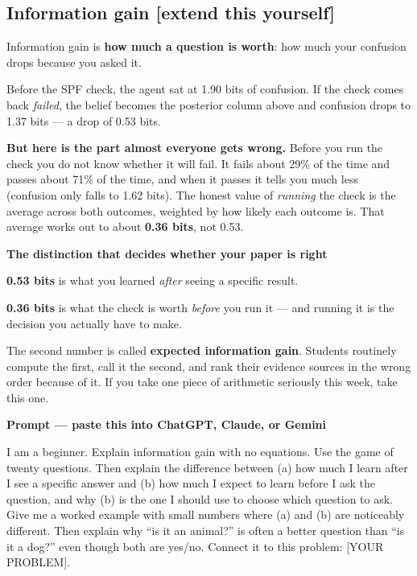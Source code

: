 \documentclass[11pt,a4paper]{article}
\newcommand{\keyword}[1]{\textbf{#1}}
\newcommand{\boxtitle}[1]{{\bfseries #1}\par\vspace{2pt}}
\newcommand{\taught}{\hfill{\footnotesize\sffamily\color{sbaccent}[extend this yourself]}}
\newenvironment{learnprompt}
  {\begin{sbbox}\boxtitle{Prompt --- paste this into ChatGPT, Claude, or Gemini}%
   \ttfamily\small\raggedright}
  {\end{sbbox}}
\begin{document}
\subsection{Information gain \taught}

Information gain is \textbf{how much a question is worth}: how much your confusion drops because
you asked it.

Before the SPF check, the agent sat at 1.90 bits of confusion. If the check comes back
\emph{failed}, the belief becomes the posterior column above and confusion drops to 1.37 bits ---
a drop of 0.53 bits.

\textbf{But here is the part almost everyone gets wrong.} Before you run the check you do not
know whether it will fail. It fails about 29\% of the time and passes about 71\% of the time, and
when it passes it tells you much less (confusion only falls to 1.62 bits). The honest value of
\emph{running} the check is the average across both outcomes, weighted by how likely each outcome
is. That average works out to about \textbf{0.36 bits}, not 0.53.

\begin{sbbox}
\boxtitle{The distinction that decides whether your paper is right}
\textbf{0.53 bits} is what you learned \emph{after} seeing a specific result.

\textbf{0.36 bits} is what the check is worth \emph{before} you run it --- and running it is the
decision you actually have to make.

The second number is called \keyword{expected information gain}. Students routinely compute the
first, call it the second, and rank their evidence sources in the wrong order because of it. If
you take one piece of arithmetic seriously this week, take this one.
\end{sbbox}

\begin{learnprompt}
I am a beginner. Explain information gain with no equations. Use the game of twenty questions.
Then explain the difference between (a) how much I learn after I see a specific answer and
(b) how much I expect to learn before I ask the question, and why (b) is the one I should use to
choose which question to ask. Give me a worked example with small numbers where (a) and (b) are
noticeably different. Then explain why ``is it an animal?'' is often a better question than
``is it a dog?'' even though both are yes/no. Connect it to this problem: [YOUR PROBLEM].
\end{learnprompt}
\end{document}
